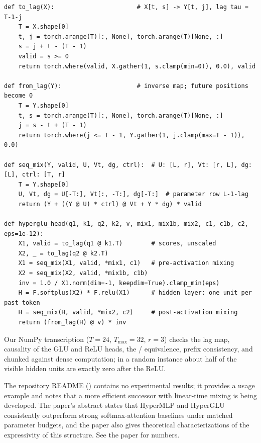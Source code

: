 \begin{lstlisting}[caption={Reference implementation (ours): a HyperGLU head with lag-indexed mixing.},label={lst:c04-hyper-ref}]
def to_lag(X):                       # X[t, s] -> Y[t, j], lag tau = T-1-j
    T = X.shape[0]
    t, j = torch.arange(T)[:, None], torch.arange(T)[None, :]
    s = j + t - (T - 1)
    valid = s >= 0
    return torch.where(valid, X.gather(1, s.clamp(min=0)), 0.0), valid

def from_lag(Y):                     # inverse map; future positions become 0
    T = Y.shape[0]
    t, s = torch.arange(T)[:, None], torch.arange(T)[None, :]
    j = s - t + (T - 1)
    return torch.where(j <= T - 1, Y.gather(1, j.clamp(max=T - 1)), 0.0)

def seq_mix(Y, valid, U, Vt, dg, ctrl):  # U: [L, r], Vt: [r, L], dg: [L], ctrl: [T, r]
    T = Y.shape[0]
    U, Vt, dg = U[-T:], Vt[:, -T:], dg[-T:]  # parameter row L-1-lag
    return (Y + ((Y @ U) * ctrl) @ Vt + Y * dg) * valid

def hyperglu_head(q1, k1, q2, k2, v, mix1, mix1b, mix2, c1, c1b, c2, eps=1e-12):
    X1, valid = to_lag(q1 @ k1.T)        # scores, unscaled
    X2, _ = to_lag(q2 @ k2.T)
    X1 = seq_mix(X1, valid, *mix1, c1)   # pre-activation mixing
    X2 = seq_mix(X2, valid, *mix1b, c1b)
    inv = 1.0 / X1.norm(dim=-1, keepdim=True).clamp_min(eps)
    H = F.softplus(X2) * F.relu(X1)      # hidden layer: one unit per past token
    H = seq_mix(H, valid, *mix2, c2)     # post-activation mixing
    return (from_lag(H) @ v) * inv
\end{lstlisting}

Our NumPy transcription ($T=24$, $T_{\max}=32$, $r=3$) checks the lag map, causality of the GLU
and ReLU heads, the / equivalence, prefix consistency, and chunked
against dense computation; in a random instance about half of the visible hidden units are exactly
zero after the ReLU.

\begin{results}
The repository README () contains no experimental
results; it provides a usage example and notes that a more efficient successor with linear-time
mixing is being developed. The paper's abstract states that HyperMLP and HyperGLU consistently
outperform strong softmax-attention baselines under matched parameter budgets, and the paper also
gives theoretical characterizations of the expressivity of this structure. See the paper for
numbers.
\end{results}

